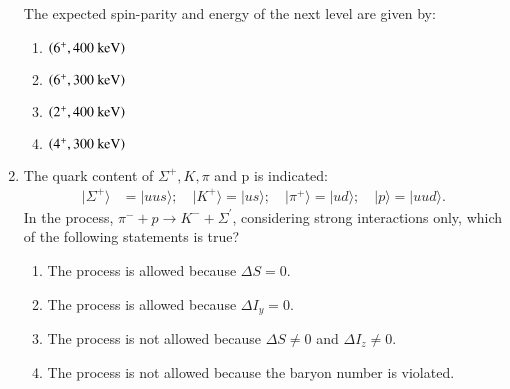 \documentclass[journal]{IEEEtran}
\begin{document}
\begin{enumerate}[start=27]
\begin{figure}[H]
\centering
{}%
\label{fig:my_label}
\end{figure}
The expected spin-parity and energy of the next level are given by:
\begin{multicols}{2}
\begin{enumerate}
\item $\left(6^+, 400 \text{ keV}\right)$
\item $\left(6^+, 300 \text{ keV}\right)$
\item $\left(2^+, 400 \text{ keV}\right)$
\item $\left(4^+, 300 \text{ keV}\right)$
\end{enumerate} 
\end{multicols}

\item The quark content of $\Sigma^+, K, \pi$ and p is indicated:
\begin{align*}
|\Sigma^+\rangle &= |uus\rangle; \quad |K^+\rangle = |us\rangle; \quad |\pi^+\rangle = |ud\rangle; \quad |p\rangle = |uud\rangle.
\end{align*}
In the process, $\pi^{-} + p \rightarrow K^{-} + \Sigma^{\prime}$, considering strong interactions only, which of the following statements is true?

\begin{enumerate}
    \item The process is allowed because $\Delta S = 0$.
    \item The process is allowed because $\Delta I_{y} = 0$.
    \item The process is not allowed because $\Delta S \neq 0$ and $\Delta I_{z} \neq 0$.
    \item The process is not allowed because the baryon number is violated.
\end{enumerate}


\end{enumerate}
\end{document}

